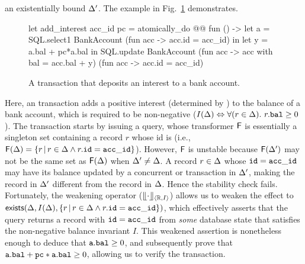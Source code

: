 an existentially bound $\Delta'$. The example in
Fig.~\ref{fig:weakening-example} demonstrates.
\begin{figure}[h]
\begin{center}
\begin{ocaml}
let add_interest acc_id pc = atomically_do @@ fun () ->
  let a = SQL.select1 BankAccount (fun acc -> acc.id = acc_id) in
  let y = a.bal + pc*a.bal in
  SQL.update BankAccount (fun acc -> {acc with bal = acc.bal + y})
                         (fun acc -> acc.id = acc_id)
\end{ocaml}
\end{center}
\caption{A transaction that deposits an interest to a bank account.}
\label{fig:weakening-example}
\end{figure}
Here, an  transaction adds a positive interest
(determined by ) to the balance of a bank account, which is
required to be non-negative ($I(\Delta) \Leftrightarrow
\forall(r\in\Delta).~r.{\tt bal}\ge 0$). The transaction starts by issuing
a  query, whose transformer ${\sf F}$ is essentially a singleton
set containing a record $r$ whose id is  (i.e.,
${\sf F}(\Delta) = \{r \,|\, r\in\Delta \wedge r.{\tt id} = {\tt acc\_id}\}$).
However, ${\sf F}$ is unstable because ${\sf F}(\Delta')$ may not be
the same set as ${\sf F}(\Delta)$ when $\Delta'\neq\Delta$. A record
$r\in\Delta$ whose ${\tt id}={\tt acc\_id}$ may have its balance updated by
a concurrent  or  transaction in $\Delta'$,
making the record in $\Delta'$ different from the record in $\Delta$.
Hence the stability check fails.  Fortunately, the weakening operator
($\llfloor \cdot \rrfloor_{\langle \mathbb{R},I \rangle}$) allows us to weaken the effect to
${\sf exists}(\Delta, I(\Delta), \{ r \,|\, r\in\Delta \wedge
r.{\tt id}={\tt acc\_id}\})$, which effectively asserts that the
 query returns a record with ${\tt id}={\tt acc\_id}$ from
\emph{some} database state that satisfies the non-negative balance
invariant $I$.  This weakened assertion is nonetheless enough to
deduce that ${\tt a.bal}\ge0$, and subsequently prove that ${\tt a.bal +
pc*a.bal}\ge 0$, allowing us to verify the 
transaction.

